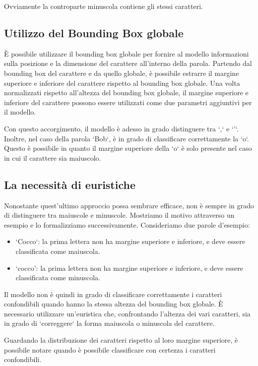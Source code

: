 Ovviamente la controparte minuscola contiene gli stessi caratteri.

\subsection{Utilizzo del Bounding Box globale}

È possibile utilizzare il bounding box globale per fornire al modello informazioni sulla posizione e la dimensione del carattere all'interno della parola. Partendo dal bounding box del carattere e da quello globale, è possibile estrarre il margine superiore e inferiore del carattere rispetto al bounding box globale. Una volta normalizzati rispetto all'altezza del bounding box globale, il margine superiore e inferiore del carattere possono essere utilizzati come due parametri aggiuntivi per il modello.

Con questo accorgimento, il modello è adesso in grado distinguere tra `,` e `'`. Inoltre, nel caso della parola `Bob`, è in grado di classificare correttamente la `o`. Questo è possibile in quanto il margine superiore della `o` è solo presente nel caso in cui il carattere sia maiuscolo.

\subsection{La necessità di euristiche}

Nonostante quest'ultimo approccio possa sembrare efficace, non è sempre in grado di distinguere tra maiuscole e minuscole.
Mostriamo il motivo attraverso un esempio e lo formalizziamo successivamente.
Consideriamo due parole d'esempio:
\begin{itemize}
	\item `Cocco`: la prima lettera non ha margine superiore e inferiore, e deve essere classificata come maiuscola.
	\item `cocco': la prima lettera non ha margine superiore e inferiore, e deve essere classificata come minuscola.
\end{itemize}

Il modello non è quindi in grado di classificare correttamente i caratteri confondibili quando hanno la stessa altezza del bounding box globale.
È necessario utilizzare un'euristica che, confrontando l'altezza dei vari caratteri, sia in grado di `correggere` la forma maiuscola o minuscola del carattere.

Guardando la distribuzione dei caratteri rispetto al loro margine superiore, è possibile notare quando è possibile classificare con certezza i caratteri confondibili.

